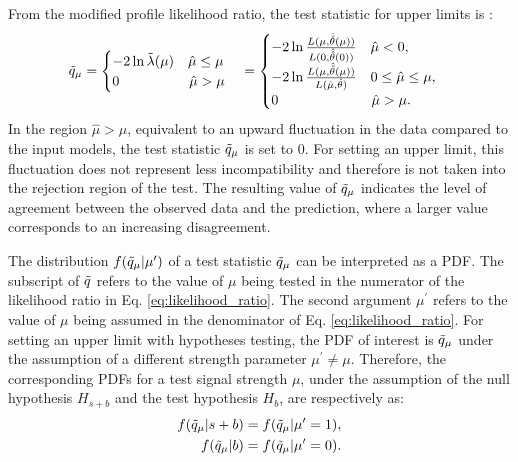 From the modified profile likelihood ratio, the test statistic for upper limits is \cite{asymptotic_test}:
\begin{equation}
    \Tilde{q}_\mu = 
    \begin{cases}
        -2\ln\Tilde{\lambda}(\mu)\ \ \ \hat{\mu} \leq \mu 
        \\
        0\ \ \ \ \ \ \ \ \ \ \  \ \ \ \ \hat{\mu} > \mu
    \end{cases}
    = 
    \begin{cases}
        -2\ln\frac{L(\mu, \hat{\hat{\theta}}(\mu) )}{L(0, \hat{\hat{\theta}} (0))}\ \ \ \hat{\mu} < 0, \\
        -2\ln\frac{L(\mu, \hat{\hat{\theta}}(\mu) )}{L(\hat{\mu}, \hat{\theta})}\ \ \ 0 \leq \hat{\mu} \leq \mu, \\
        0\ \ \ \ \ \ \ \ \ \ \ \ \ \ \ \ \ \ \ \ \hat{\mu} > \mu.
    \end{cases}
\end{equation}
In the region $\hat{\mu} > \mu$, equivalent to an upward fluctuation in the data compared to the input models, the test statistic $\Tilde{q}_\mu$ is set to 0.
For setting an upper limit, this fluctuation does not represent less incompatibility and therefore is not taken into the rejection region of the test.
The resulting value of $\Tilde{q}_\mu$ indicates the level of agreement between the observed data and the prediction, where a larger value corresponds to an increasing disagreement.

The distribution $f(\Tilde{q}_{\mu}|\mu^{\prime})$ of a test statistic $\Tilde{q}_\mu$ can be interpreted as a PDF.
The subscript of $\Tilde{q}$ refers to the value of $\mu$ being tested in the numerator of the likelihood ratio in Eq. \ref{eq:likelihood_ratio}. 
The second argument $\mu^{\prime}$ refers to the value of $\mu$ being assumed in the denominator of Eq. \ref{eq:likelihood_ratio}.
For setting an upper limit with hypotheses testing, the PDF of interest is $\Tilde{q}_{\mu}$ under the assumption of a different strength parameter $\mu^{\prime} \neq \mu$.
Therefore, the corresponding PDFs for a test signal strength $\mu$, under the assumption of the null hypothesis $H_{s+b}$ and the test hypothesis $H_b$, are respectively as:
\begin{align}
    f(\Tilde{q}_\mu | s + b ) &= f(\Tilde{q}_\mu | \mu^{\prime} = 1 ), \\
    f(\Tilde{q}_\mu | b ) &= f(\Tilde{q}_\mu | \mu^{\prime} = 0 ).
\end{align}

